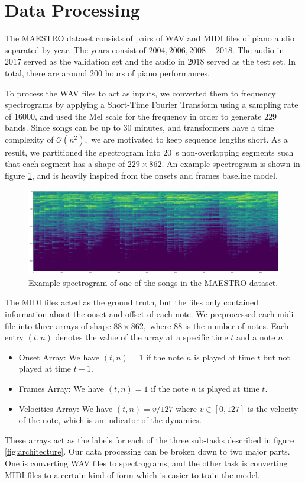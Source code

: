 \documentclass[a4paper,twocolumn,10pt]{article}
\begin{document}
\section{Data Processing}
The MAESTRO dataset consists of pairs of WAV and MIDI files of piano audio separated by year. The years consist of $2004,2006,2008-2018.$ The audio in $2017$ served as the validation set and the audio in $2018$ served as the test set. In total, there are around $200$ hours of piano performances.

To process the WAV files to act as inputs, we converted them to frequency spectrograms by applying a Short-Time Fourier Transform using a sampling rate of $16000$, and used the Mel scale for the frequency in order to generate $229$ bands. Since songs can be up to $30$ minutes, and transformers have a time complexity of $\mathcal{O}(n^2),$ we are motivated to keep sequence lengths short. As a result, we partitioned the spectrogram into \SI{20}{s} non-overlapping segments such that each segment has a shape of $229 \times 862.$ An example spectrogram is shown in figure \ref{fig:spectrogram}, and is heavily inspired from the onsets and frames baseline model\cite{onsets_and_frames}.

\begin{figure}[h!]
  \centering
  \includegraphics[width=\linewidth]{figures/spectrogram.png}
  \caption{Example spectrogram of one of the songs in the MAESTRO dataset.}
  \label{fig:spectrogram}
\end{figure}

The MIDI files acted as the ground truth, but the files only contained information about the onset and offset of each note. We preprocessed each midi file into three arrays of shape $88 \times 862,$ where $88$ is the number of notes. Each entry $(t,n)$ denotes the value of the array at a specific time $t$ and a note $n$.
\begin{itemize}
  \item Onset Array: We have $(t,n)=1$ if the note $n$ is played at time $t$ but not played at time $t-1.$
  \item Frames Array: We have $(t,n)=1$ if the note $n$ is played at time $t$.
  \item Velocities Array: We have $(t,n)=v/127$ where $v \in [0,127]$ is the velocity of the note, which is an indicator of the dynamics.
\end{itemize}
These arrays act as the labels for each of the three sub-tasks described in figure \ref{fig:architecture}.
Our data processing can be broken down to two major parts. One is converting WAV files to spectrograms, and the other task is converting MIDI files to a certain kind of form which is easier to train the model.
\end{document}
